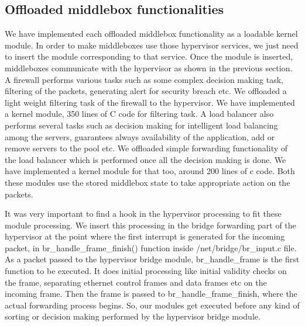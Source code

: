 \documentclass[a4paper,11pt]{report}
\begin{document}
\subsection{Offloaded middlebox functionalities}
We have implemented each offloaded middlebox functionality as a loadable kernel module. In order to make middleboxes use those hypervisor services, we just need to insert the module corresponding to that service. Once the module is inserted, middleboxes communicate with the hypervisor as shown in the previous section. A firewall performs various tasks such as some complex decision making task, filtering of the packets, generating alert for security breach etc. We offloaded a light weight filtering task of the firewall to the hypervisor. We have implemented a kernel module, 350 lines of C code for filtering task. A load balancer also performs several tasks such as decision making for intelligent load balancing among the servers, guarantees always availability of the application, add or remove servers to the pool etc. We offloaded simple forwarding functionality of the load balancer which is performed once all the decision making is done. We have implemented a kernel module for that too, around 200 lines of c code. Both these modules use the stored middlebox state to take appropriate action on the packets.

It was very important to find a hook in the hypervisor processing to fit these module processing. We insert this processing in the bridge forwarding part of the hypervisor at the point where the first interrupt is generated for the incoming packet, in br\_handle\_frame\_finish() function inside /net/bridge/br\_input.c file. As a packet passed to the hypervisor bridge module, br\_handle\_frame is the first function to be executed. It does initial processing like initial validity checks on the frame, separating ethernet control frames and data frames etc on the incoming frame. Then the frame is passed to br\_handle\_frame\_finish, where the actual forwarding process begins. So, our modules get executed before any kind of sorting or decision making performed by the hypervisor bridge module.                          
\end{document}
